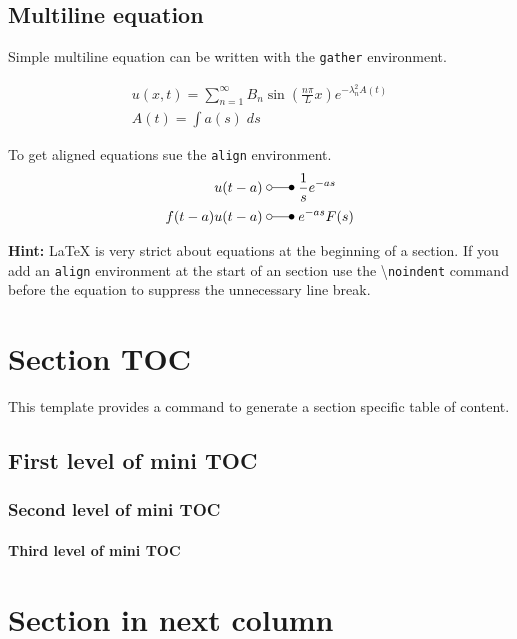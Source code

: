 \documentclass[\papersize,\fontheight,\orientationmode]{extarticle}
\begin{document}
\begin{multicols*}{3}
    \subsection{Multiline equation}
    Simple multiline equation can be written with the \texttt{gather} environment.

    \begin{gather*}
        u(x,t) =\sum_{n=1}^\infty B_n\sin(\frac{n\pi}Lx)e^{-\lambda_n^2 A(t)} \\
        A(t)=\int a(s)\;ds
    \end{gather*}

    To get aligned equations sue the \texttt{align} environment.
    \begin{align*}
        u(t-a)       \; & \laplace\; \frac{1}{s}e^{-as} \\
        f(t-a)u(t-a) \; & \laplace\; e^{-as}F(s)
    \end{align*}

    \textbf{Hint:} \LaTeX{} is very strict about equations at the beginning of a section.
    If you add an \texttt{align} environment at the start of an section use the
    \textbackslash{}\texttt{noindent} command before the equation to suppress the unnecessary
    line break.

    \section{Section TOC}
    This template provides a command to generate a section specific table of content.
    \createsectiontoc{}

    \subsection{First level of mini TOC}
    \subsubsection{Second level of mini TOC}
    \paragraph{Third level of mini TOC}


    \newcol{}

    \section{Section in next column}


\end{multicols*}
\end{document}

